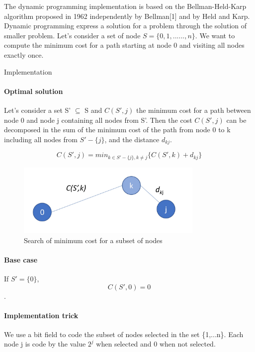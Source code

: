 \documentclass[../report.tex]{subfiles}
\begin{document}
The dynamic programming implementation is based on the Bellman-Held-Karp algorithm  proposed in 1962 independently by Bellman[1] and by Held and Karp.
\newline{}
Dynamic programming express a solution for a problem through the solution of smaller problem.
\newline{}
Let's consider a set of node $S=\{0,1,......,n\}$. We want to compute the minimum cost for a path starting at node 0 and visiting all nodes exactly once.


\begin{subsection}{Implementation}
\paragraph{Optimal solution}\hfill \break
Let's consider a set S' $\subseteq$ S and $C(S',j)$ the minimum cost for a path between node 0 and node j containing all nodes from S'. Then the cost $C(S',j)$ can be decomposed in the sum of the minimum cost of the path from node 0 to k including all nodes from $S'-\{j\}$, and the distance $d_{kj}$.

$$C(S',j)=min_{k \in S'-\{j\}, k \ne j}\{C(S',k)+d_{kj}\}$$

\begin{figure}[H]
\centering
\includegraphics[height=3.5cm,valign=t]{./Images/dp_graphalgo.jpg}
\caption{Search of minimum cost for a subset of nodes \label{fig:dpgraphalgo}}
\end{figure}

\paragraph{Base case}\hfill \break
If $S'=\{0\}$, $$C(S',0)=0$$.

\paragraph{Implementation trick}\hfill \break
We use a bit field to code the subset of nodes selected in the set \{1,...n\}.
Each node j is code by the value $2^j$ when selected and 0 when not selected. 
\end{subsection}
\end{document}
